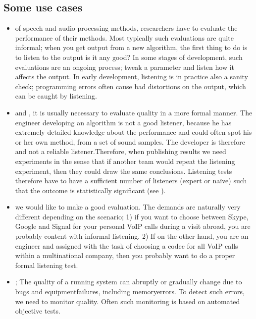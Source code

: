 \documentclass[letterpaper,10pt,english]{jupyterBook}
\begin{document}
\subsection{Some use cases}
\label{\detokenize{Evaluation/Subjective_quality_evaluation:some-use-cases}}\begin{itemize}
\item {} 
\sphinxAtStartPar
{} of speech and audio processing
methods, researchers have to evaluate the performance of their
methods. Most typically such evaluations are quite informal; when
you get output from a new algorithm, the first thing to do is to
listen to the output \sphinxhyphen{} is it any good? In some stages of
development, such evaluations are an ongoing process; tweak a
parameter and listen how it affects the output. In early
development, listening is in practice also a sanity check;
programming errors often cause bad distortions on the output, which
can be caught by listening.

\item {} 
\sphinxAtStartPar
{} and , it
is usually necessary to evaluate quality in a more formal manner.
The engineer developing an algorithm is not a good listener, because
he has extremely detailed knowledge about the performance and could
often spot his or her own method, from a set of sound samples. The
developer is therefore  and not a reliable listener.Therefore, when publishing results we need 
experiments in the sense that if another team would repeat the
listening experiment, then they could draw the same conclusions.
Listening tests therefore have to have a sufficient number of
listeners (expert or naïve) such that the outcome is statistically
significant (see {\hyperref[\detokenize{Evaluation/Analysis_of_evaluation_results::doc}]{}}).

\item {} 
\sphinxAtStartPar
{} we would like
to make a good evaluation. The demands are naturally very different
depending on the scenario; 1) if you want to choose between Skype,
Google and Signal for your personal VoIP calls during a visit
abroad, you are probably content with informal listening. 2) If on
the other hand, you are an engineer and assigned with the task of
choosing a codec for all VoIP calls within a multi\sphinxhyphen{}national company,
then you probably want to do a proper formal listening test.

\item {} 
\sphinxAtStartPar
{}; The quality of a
running system can abruptly or gradually change due to bugs and
equipment\sphinxhyphen{}failures, including memory\sphinxhyphen{}errors. To detect such errors,
we need to monitor quality. Often such monitoring is based on
automated objective tests.

\end{itemize}
\end{document}
